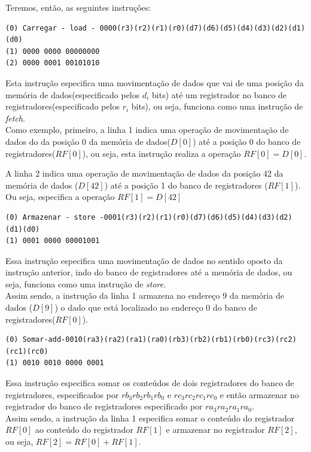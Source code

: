 \documentclass{article}
\begin{document}
Teremos, então, as seguintes instruções:


\begin{boxedd}
\begin{lstlisting}
(0) Carregar - load - 0000(r3)(r2)(r1)(r0)(d7)(d6)(d5)(d4)(d3)(d2)(d1)(d0)
(1) 0000 0000 00000000
(2) 0000 0001 00101010
\end{lstlisting}    
Esta instrução especifica uma movimentação de dados que vai de uma posição da memória de dados(especificado pelos $d_i$ bits) até um registrador no banco de registradores(especificado pelos $r_i$ bits), ou seja, funciona como uma instrução de \textit{fetch}.\\
Como exemplo, primeiro, a linha 1 indica uma operação de movimentação de dados do da posição 0 da memória de dados($D[0]$) até a posição 0 do banco de registradores($RF[0]$), ou seja, esta instrução realiza a operação $RF[0]=D[0]$. 

A linha 2 indica uma operação de movimentação de dados da posição 42 da memória de dados ($D[42]$) até a posição 1 do banco de registradores ($RF[1]$). Ou seja, especifica a operação $RF[1]=D[42]$
\end{boxedd}
 

\begin{boxedd}
\begin{lstlisting}
(0) Armazenar - store -0001(r3)(r2)(r1)(r0)(d7)(d6)(d5)(d4)(d3)(d2)(d1)(d0)
(1) 0001 0000 00001001
\end{lstlisting}    
Essa instrução especifica uma movimentação de dados no sentido oposto da instrução anterior, indo do banco de registradores até a memória de dados, ou seja, funciona como uma instrução de \textit{store}. \\
Assim sendo, a instrução da linha 1 armazena no endereço 9 da memória de dados ($D[9]$) o dado que está localizado no endereço 0 do banco de registradores($RF[0]$).
\end{boxedd}
 
\begin{boxedd}
\begin{lstlisting}
(0) Somar-add-0010(ra3)(ra2)(ra1)(ra0)(rb3)(rb2)(rb1)(rb0)(rc3)(rc2)(rc1)(rc0)
(1) 0010 0010 0000 0001
\end{lstlisting}    
Essa instrução especifica somar os conteúdos de dois registradores do banco de registradores, especificados por $rb_3 rb_2 rb_1 rb_0$ e $rc_3 rc_2 rc_1 rc_0$ e então armazenar no registrador do banco de registradores especificado por $ra_3 ra_2 ra_1 ra_0$.\\
Assim sendo, a instrução da linha 1 especifica somar o conteúdo do registrador $RF[0]$ ao conteúdo do registrador $RF[1]$ e armazenar no registrador $RF[2]$, ou seja, $RF[2] = RF[0] + RF[1]$.
\end{boxedd}
\end{document}

